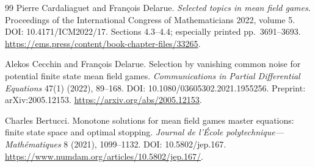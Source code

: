\documentclass[11pt,a4paper]{article}
\theoremstyle{definition}
\theoremstyle{remark}
\begin{document}
\begin{thebibliography}{99}
\small
{}
Pierre Cardaliaguet and Fran\c{c}ois Delarue.
\emph{Selected topics in mean field games}. Proceedings of the International Congress of Mathematicians 2022, volume 5.
DOI: 10.4171/ICM2022/17. Sections 4.3--4.4; especially printed pp.~3691--3693.
\url{https://ems.press/content/book-chapter-files/33265}.

Alekos Cecchin and Fran\c{c}ois Delarue.
Selection by vanishing common noise for potential finite state mean field games.
\emph{Communications in Partial Differential Equations} 47(1) (2022), 89--168.
DOI: 10.1080/03605302.2021.1955256. Preprint: arXiv:2005.12153.
\url{https://arxiv.org/abs/2005.12153}.

Charles Bertucci.
Monotone solutions for mean field games master equations: finite state space and optimal stopping.
\emph{Journal de l'\'Ecole polytechnique---Math\'ematiques} 8 (2021), 1099--1132.
DOI: 10.5802/jep.167.
\url{https://www.numdam.org/articles/10.5802/jep.167/}.

\end{thebibliography}
\end{document}
